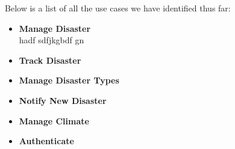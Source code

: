 Below is a list of all the use cases we have identified thus far:
\begin{itemize}%
	\item \textbf{Manage Disaster}\\hadf sdfjkgbdf gn
	\item \textbf{Track Disaster} \\
	\item \textbf{Manage Disaster Types} \\
	\item \textbf{Notify New Disaster} \\
	\item \textbf{Manage Climate} \\
	\item \textbf{Authenticate} \\
\end{itemize}